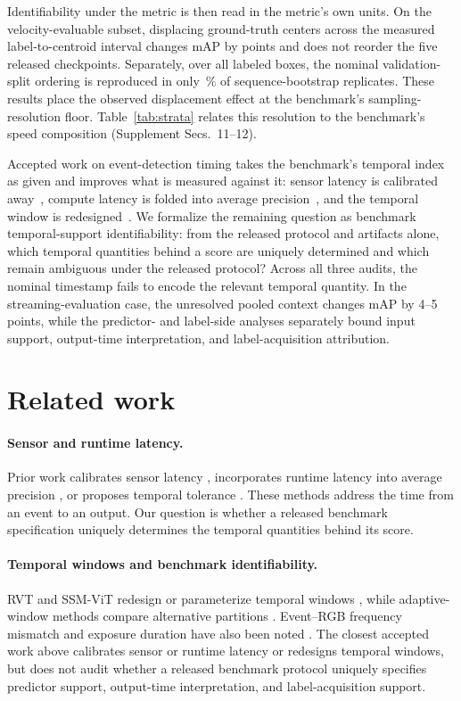 \documentclass[10pt,twocolumn,letterpaper]{article}
\begin{document}
Identifiability under the metric is then read in the metric's own units. On the
velocity-evaluable subset, displacing ground-truth centers across the measured label-to-centroid
interval changes mAP by \mapCost{} points and does not reorder the five released checkpoints.
Separately, over all labeled boxes, the nominal validation-split ordering is reproduced in only
\rankHoldBox\,\% of sequence-bootstrap replicates. These results place the observed displacement
effect at the benchmark's sampling-resolution floor. Table~\ref{tab:strata} relates this
resolution to the benchmark's speed composition (Supplement Secs.~11--12).

Accepted work on event-detection timing takes the benchmark's temporal index as given and
improves what is measured against it: sensor latency is calibrated away~\cite{yang2024latency,
liu2024nighttime}, compute latency is folded into average
precision~\cite{li2020streaming,yang2022streamyolo,chu2026stare}, and the temporal window is
redesigned~\cite{gehrig2023rvt,zubic2024ssm}. We formalize the remaining question as
benchmark temporal-support identifiability: from the released protocol and artifacts alone,
which temporal quantities behind a score are uniquely determined and which remain ambiguous under
the released protocol?
Across all three audits, the nominal timestamp fails to encode the relevant temporal quantity.
In the streaming-evaluation case, the unresolved pooled context changes mAP by 4--5 points,
while the predictor- and label-side analyses separately bound input support, output-time
interpretation, and label-acquisition attribution.

\section{Related work}
\label{sec:related}

\paragraph{Sensor and runtime latency.}
Prior work calibrates sensor latency
\cite{yang2024latency,liu2024nighttime}, incorporates runtime latency into
average precision \cite{li2020streaming,yang2022streamyolo,chu2026stare}, or
proposes temporal tolerance \cite{softed2024}. These methods address the time
from an event to an output. Our question is whether a released benchmark
specification uniquely determines the temporal quantities behind its score.

\paragraph{Temporal windows and benchmark identifiability.}
RVT and SSM-ViT redesign or parameterize temporal windows
\cite{gehrig2023rvt,zubic2024ssm}, while adaptive-window methods compare
alternative partitions \cite{sui2026astw}. Event--RGB frequency mismatch and
exposure duration have also been noted \cite{faod2024,sun2023refid,kim2022unknownexposure}.
The closest accepted work above calibrates sensor or runtime latency or redesigns temporal
windows, but does not audit whether a released benchmark protocol uniquely specifies predictor
support, output-time interpretation, and label-acquisition support.
\end{document}
